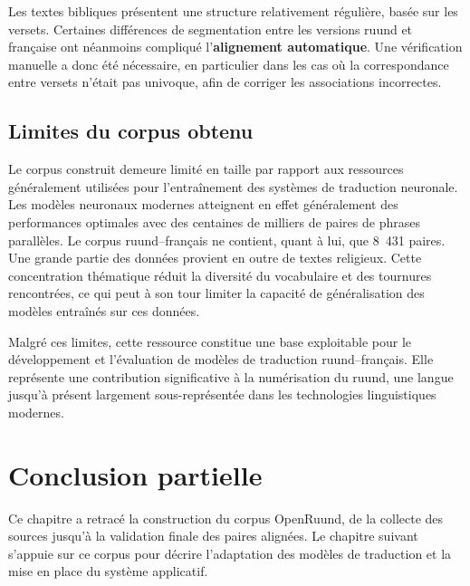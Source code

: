 Les textes bibliques présentent une structure relativement régulière, basée sur les versets. Certaines différences de segmentation entre les versions ruund et française ont néanmoins compliqué l'\textbf{alignement automatique}. Une vérification manuelle a donc été nécessaire, en particulier dans les cas où la correspondance entre versets n'était pas univoque, afin de corriger les associations incorrectes.

\subsection{Limites du corpus obtenu}

Le corpus construit demeure limité en taille par rapport aux ressources généralement utilisées pour l'entraînement des systèmes de traduction neuronale. Les modèles neuronaux modernes atteignent en effet généralement des performances optimales avec des centaines de milliers de paires de phrases parallèles. Le corpus ruund–français ne contient, quant à lui, que 8~431 paires. Une grande partie des données provient en outre de textes religieux. Cette concentration thématique réduit la diversité du vocabulaire et des tournures rencontrées, ce qui peut à son tour limiter la capacité de généralisation des modèles entraînés sur ces données.

Malgré ces limites, cette ressource constitue une base exploitable pour le développement et l'évaluation de modèles de traduction ruund–français. Elle représente une contribution significative à la numérisation du ruund, une langue jusqu'à présent largement sous-représentée dans les technologies linguistiques modernes.

\section*{Conclusion partielle}

Ce chapitre a retracé la construction du corpus OpenRuund, de la collecte des sources jusqu'à la validation finale des paires alignées. Le chapitre suivant s'appuie sur ce corpus pour décrire l'adaptation des modèles de traduction et la mise en place du système applicatif.